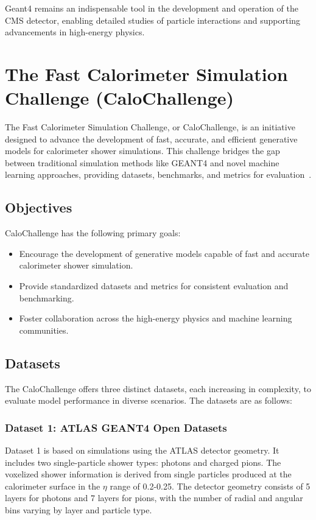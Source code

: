 Geant4 remains an indispensable tool in the development and operation of the CMS detector, enabling detailed studies of particle interactions and supporting advancements in high-energy physics.

\section{The Fast Calorimeter Simulation Challenge (CaloChallenge)}

The Fast Calorimeter Simulation Challenge, or CaloChallenge, is an initiative designed to advance the development of fast, accurate, and efficient generative models for calorimeter shower simulations. This challenge bridges the gap between traditional simulation methods like GEANT4 and novel machine learning approaches, providing datasets, benchmarks, and metrics for evaluation~\cite{calochallenge}.

\subsection{Objectives}

CaloChallenge has the following primary goals:

\begin{itemize}
    \item Encourage the development of generative models capable of fast and accurate calorimeter shower simulation.
    \item Provide standardized datasets and metrics for consistent evaluation and benchmarking.
    \item Foster collaboration across the high-energy physics and machine learning communities.
\end{itemize}

\subsection{Datasets}

The CaloChallenge offers three distinct datasets, each increasing in complexity, to evaluate model performance in diverse scenarios. The datasets are as follows:

\subsubsection{Dataset 1: ATLAS GEANT4 Open Datasets}
Dataset 1 is based on simulations using the ATLAS detector geometry. It includes two single-particle shower types: photons and charged pions. The voxelized shower information is derived from single particles produced at the calorimeter surface in the $\eta$ range of 0.2-0.25. The detector geometry consists of 5 layers for photons and 7 layers for pions, with the number of radial and angular bins varying by layer and particle type.

